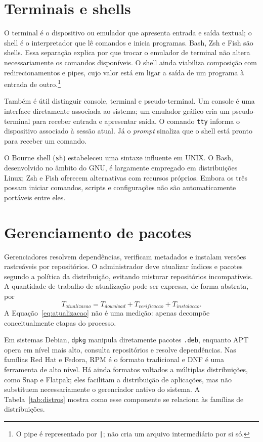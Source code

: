 \documentclass[12pt,openright,oneside,a4paper,brazil]{abntex2}
\begin{document}
\chapter{Terminais e shells}
O terminal é o dispositivo ou emulador que apresenta entrada e saída textual; o shell é o interpretador que lê comandos e inicia programas. Bash, Zsh e Fish são shells. Essa separação explica por que trocar o emulador de terminal não altera necessariamente os comandos disponíveis. O shell ainda viabiliza composição com redirecionamentos e pipes, cujo valor está em ligar a saída de um programa à entrada de outro.\footnote{O pipe é representado por \texttt{|}; não cria um arquivo intermediário por si só.}

Também é útil distinguir console, terminal e pseudo-terminal. Um console é uma interface diretamente associada ao sistema; um emulador gráfico cria um pseudo-terminal para receber entrada e apresentar saída. O comando \texttt{tty} informa o dispositivo associado à sessão atual. Já o \textit{prompt} sinaliza que o shell está pronto para receber um comando.

O Bourne shell (\texttt{sh}) estabeleceu uma sintaxe influente em UNIX. O Bash, desenvolvido no âmbito do GNU, é largamente empregado em distribuições Linux; Zsh e Fish oferecem alternativas com recursos próprios. Embora os três possam iniciar comandos, scripts e configurações não são automaticamente portáveis entre eles.

\chapter{Gerenciamento de pacotes}
Gerenciadores resolvem dependências, verificam metadados e instalam versões rastreáveis por repositórios. O administrador deve atualizar índices e pacotes segundo a política da distribuição, evitando misturar repositórios incompatíveis. A quantidade de trabalho de atualização pode ser expressa, de forma abstrata, por
\begin{equation}\label{eq:atualizacao}
T_{atualizacao}=T_{download}+T_{verificacao}+T_{instalacao}.
\end{equation}
A Equação~\ref{eq:atualizacao} não é uma medição: apenas decompõe conceitualmente etapas do processo.

Em sistemas Debian, \texttt{dpkg} manipula diretamente pacotes \texttt{.deb}, enquanto APT opera em nível mais alto, consulta repositórios e resolve dependências. Nas famílias Red Hat e Fedora, RPM é o formato tradicional e DNF é uma ferramenta de alto nível. Há ainda formatos voltados a múltiplas distribuições, como Snap e Flatpak; eles facilitam a distribuição de aplicações, mas não substituem necessariamente o gerenciador nativo do sistema. A Tabela~\ref{tab:distros} mostra como esse componente se relaciona às famílias de distribuições.
\end{document}
